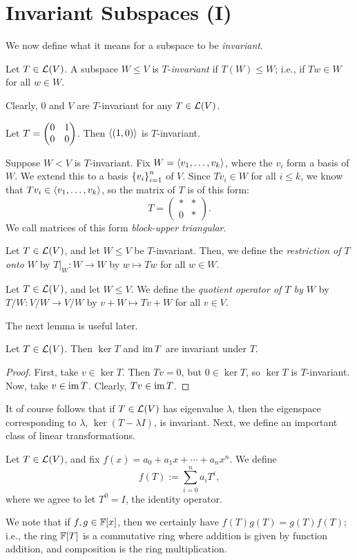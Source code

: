\documentclass{article}
\begin{document}
\section{Invariant Subspaces (I)}
We now define what it means for a subspace to be \textit{invariant}.
\begin{definition}
Let $T\in\mathcal L(V)$. A subspace $W\leq V$ is $T$-\textit{invariant} if $T(W)\leq W$; i.e., if $Tw \in W$ for all $w\in W$.
\end{definition}

Clearly, $0$ and $V$ are $T$-invariant for any $T\in \mathcal L(V)$.
\begin{example}
Let $T = \begin{pmatrix}0 & 1 \\ 0 & 0 \end{pmatrix}$. Then $\left\langle(1,0)\right\rangle$ is $T$-invariant.
\end{example}
Suppose $W<V$ is $T$-invariant. Fix $W = \left\langle v_1, \ldots, v_k\right\rangle$, where the $v_i$ form a basis of $W$. We extend this to a basis $\left\{v_i\right\}_{i=1}^n$ of $V$. Since $Tv_i \in W$ for all $i\leq k$, we know that $Tv_i\in \left\langle v_1, \ldots, v_k\right\rangle$, so the matrix of $T$ is of this form:
$$T = \begin{pmatrix}
* & * \\ 0 & *
\end{pmatrix}.$$
We call matrices of this form \textit{block-upper triangular}.
\begin{definition}
Let $T\in\mathcal L(V)$, and let $W\leq V$ be $T$-invariant. Then, we define the \textit{restriction of $T$ onto $W$} by $T|_W: W\to W$ by $w\mapsto Tw$ for all $w\in W$.
\end{definition}
\begin{definition}
Let $T\in\mathcal L(V)$, and let $W\leq V$. We define the \textit{quotient operator of $T$ by $W$} by $T/W: V/W \to V/W$ by $v+W\mapsto Tv+W$ for all $v\in V$.
\end{definition}
The next lemma is useful later.
\begin{lemma}
Let $T\in\mathcal L(V)$. Then $\ker T$ and $\operatorname{im} T$ are invariant under $T$.
\end{lemma}
\begin{proof}
First, take $v\in\ker T$. Then $Tv = 0$, but $0\in\ker T$, so $\ker T$ is $T$-invariant. Now, take $v\in \operatorname{im} T$. Clearly, $Tv\in \operatorname{im} T$.
\end{proof}
It of course follows that if $T\in\mathcal L(V)$ has eigenvalue $\lambda$, then the eigenspace corresponding to $\lambda$, $\ker(T-\lambda I)$, is invariant. Next, we define an important class of linear transformations.

\newpage
\begin{definition}
Let $T\in\mathcal L(V)$, and fix $f(x)=a_0 + a_1x + \cdots + a_nx^n$. We define
$$f(T) := \sum_{i=0}^n a_iT^i,$$
where we agree to let $T^0 = I$, the identity operator.
\end{definition}
We note that if $f, g\in \mathbb F[x]$, then we certainly have $f(T)g(T) = g(T)f(T)$; i.e., the ring $\mathbb F[T]$ is a commutative ring where addition is given by function addition, and composition is the ring multiplication.
\end{document}
